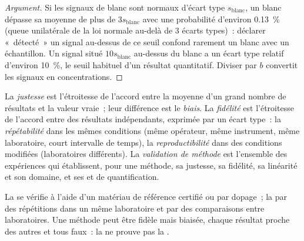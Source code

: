 \begin{proof}[Argument]
Si les signaux de blanc sont normaux d'écart type $s_{\mathrm{blanc}}$, un blanc dépasse sa moyenne de
plus de $3s_{\mathrm{blanc}}$ avec une probabilité d'environ 0.13~\% (queue unilatérale de la loi normale
au-delà de 3 écarts types)~: déclarer «~détecté~» un signal au-dessus de ce seuil confond rarement un
blanc avec un échantillon. Un signal situé $10s_{\mathrm{blanc}}$ au-dessus du blanc a un écart type relatif
d'environ 10~\%, le seuil habituel d'un résultat quantitatif. Diviser par $b$ convertit les signaux en
concentrations.
\end{proof}

\begin{definition}[Validation]\label{def:b2:measurement-statistics:validation}
La \emph{justesse} est l'étroitesse de l'accord entre la moyenne d'un grand nombre de
résultats et la valeur vraie~; leur différence est le \emph{biais}. La \emph{fidélité}
est l'étroitesse de l'accord entre des résultats indépendants, exprimée par un écart type~: la
\emph{répétabilité} dans les mêmes conditions (même opérateur, même
instrument, même laboratoire, court intervalle de temps), la \emph{reproductibilité}
dans des conditions modifiées (laboratoires différents). La \emph{validation de méthode}
est l'ensemble des expériences qui établissent, pour une méthode, sa justesse, sa fidélité, sa linéarité
et son domaine, et ses  et de quantification.
\end{definition}

La  se vérifie à l'aide d'un matériau de référence certifié ou par dopage~; la  par des
répétitions dans un même laboratoire et par des comparaisons entre laboratoires. Une méthode peut être
fidèle mais biaisée, chaque résultat proche des autres et tous faux~: la  ne prouve pas la .

